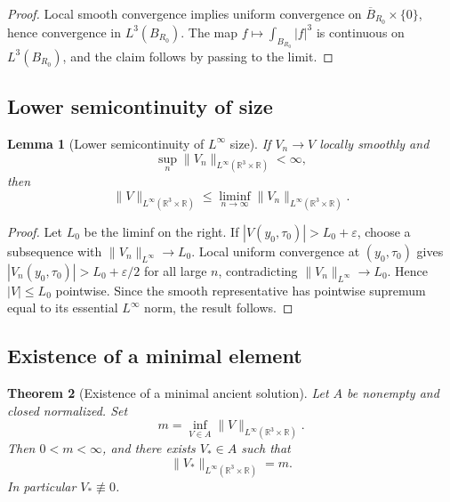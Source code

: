 \documentclass[11pt]{amsart}
\theoremstyle{plain}
\newtheorem{theorem}{Theorem}[section]
\newtheorem{lemma}[theorem]{Lemma}
\theoremstyle{definition}
\theoremstyle{remark}
\numberwithin{equation}{section}
\newcommand{\R}{\mathbb R}
\newcommand{\eps}{\varepsilon}
\begin{document}
\begin{proof}
Local smooth convergence implies uniform convergence on
\(\overline B_{R_0}\times\{0\}\), hence convergence in
\(L^3(B_{R_0})\).  The map \(f\mapsto\int_{B_{R_0}}|f|^3\) is continuous on
\(L^3(B_{R_0})\), and the claim follows by passing to the limit.
\end{proof}

\subsection{Lower semicontinuity of size}

\begin{lemma}[Lower semicontinuity of \(L^\infty\) size]
\label{lem:lsc-size}
If \(V_n\to V\) locally smoothly and
\[
   \sup_n\|V_n\|_{L^\infty(\R^3\times\R)}<\infty,
\]
then
\[
   \|V\|_{L^\infty(\R^3\times\R)}
   \le
   \liminf_{n\to\infty}
   \|V_n\|_{L^\infty(\R^3\times\R)}.
\]
\end{lemma}

\begin{proof}
Let \(L_0\) be the liminf on the right.  If
\(|V(y_0,\tau_0)|>L_0+\eps\), choose a subsequence with
\(\|V_n\|_{L^\infty}\to L_0\).  Local uniform convergence at
\((y_0,\tau_0)\) gives
\(|V_n(y_0,\tau_0)|>L_0+\eps/2\) for all large \(n\), contradicting
\(\|V_n\|_{L^\infty}\to L_0\).  Hence \(|V|\le L_0\) pointwise.  Since the
smooth representative has pointwise supremum equal to its essential
\(L^\infty\) norm, the result follows.
\end{proof}

\subsection{Existence of a minimal element}

\begin{theorem}[Existence of a minimal ancient solution]
\label{thm:minimal-existence}
Let \(A\) be nonempty and closed normalized.  Set
\[
   m=
   \inf_{V\in A}
   \|V\|_{L^\infty(\R^3\times\R)}.
\]
Then \(0<m<\infty\), and there exists \(V_*\in A\) such that
\[
   \|V_*\|_{L^\infty(\R^3\times\R)}=m.
\]
In particular \(V_*\not\equiv0\).
\end{theorem}
\end{document}
